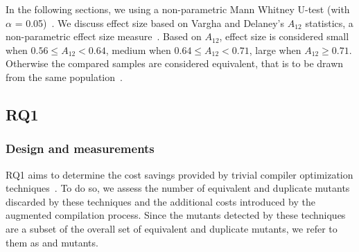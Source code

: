In the following sections, we 
using a non-parametric Mann Whitney U-test (with $\alpha$ = 0.05)~\cite{Arcuri:practicalGuide:ICSE:2015}.  We discuss effect size based on Vargha and Delaney’s $A_{12}$ statistics, a non-parametric effect size measure~\cite{VDA,Arcuri:practicalGuide:ICSE:2015}. Based on $A_{12}$, effect size is considered small when $0.56 \le A_{12} < 0.64$, medium when $0.64 \le A_{12} < 0.71$, large when $A_{12} \ge 0.71$. Otherwise the compared samples are considered equivalent, that is to be drawn from the same population~\cite{VDA}.


% 







%

\subsection{RQ1}




\subsubsection{Design and measurements}

RQ1 aims to determine the cost savings provided by 
trivial compiler optimization techniques~\cite{papadakis2015trivial,kintis2017detecting}. To do so, we assess the number of equivalent and duplicate mutants discarded by these techniques and the additional costs introduced by the augmented compilation process. Since the mutants detected by these techniques 
are a subset of 
the overall set of equivalent and duplicate mutants, we refer to them as  and  mutants.

